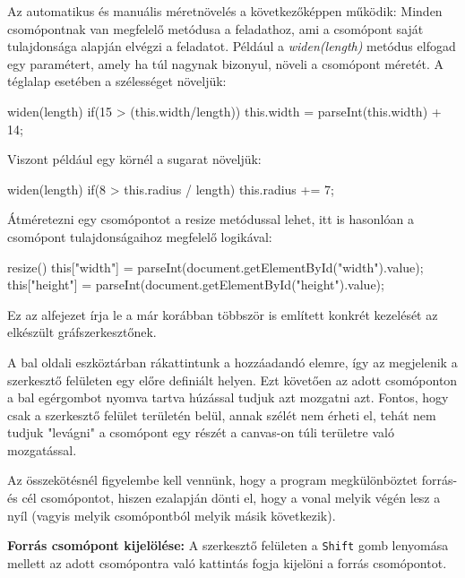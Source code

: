 Az automatikus és manuális méretnövelés a következőképpen működik: 
Minden csomópontnak van megfelelő metódusa a feladathoz, ami a csomópont saját tulajdonsága alapján elvégzi a feladatot. Például a \textit{widen(length)} metódus elfogad egy paramétert, amely ha túl nagynak bizonyul, növeli a csomópont méretét. A téglalap esetében a szélességet növeljük:

\begin{javascript}
widen(length){
   if(15 > (this.width/length))
   {
       this.width = parseInt(this.width) + 14;
   }
}
\end{javascript}

Viszont például egy körnél a sugarat növeljük:

\begin{javascript}
widen(length){
   if(8 > this.radius / length)
   {
       this.radius += 7;
   }
}
\end{javascript}

Átméretezni egy csomópontot a resize metódussal lehet, itt is hasonlóan a csomópont tulajdonságaihoz megfelelő logikával:

\begin{javascript}
resize(){
   this["width"] = parseInt(document.getElementById("width").value);
   this["height"] =  parseInt(document.getElementById("height").value);
}
\end{javascript}

Ez az alfejezet írja le a már korábban többször is említett konkrét kezelését az elkészült gráfszerkesztőnek.


A bal oldali eszköztárban rákattintunk a hozzáadandó elemre, így az megjelenik a szerkesztő felületen egy előre definiált helyen. Ezt követően az adott csomóponton a bal egérgombot nyomva tartva húzással tudjuk azt mozgatni azt. Fontos, hogy csak a szerkesztő felület területén belül, annak szélét nem érheti el, tehát nem tudjuk "levágni" a csomópont egy részét a canvas-on túli területre való mozgatással.


Az összekötésnél figyelembe kell vennünk, hogy a program megkülönböztet forrás- és cél csomópontot, hiszen ezalapján dönti el, hogy a vonal melyik végén lesz a nyíl (vagyis melyik csomópontból melyik másik következik).

\textbf{Forrás csomópont kijelölése:} A szerkesztő felületen a \texttt{Shift} gomb lenyomása mellett az adott csomópontra való kattintás fogja kijelöni a forrás csomópontot.

